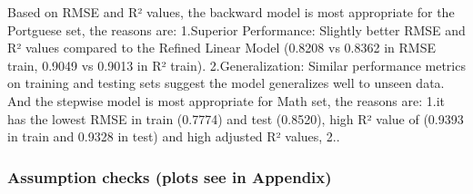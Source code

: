 \documentclass[letterpaper,9pt,twocolumn,twoside,]{pinp}
\begin{document}
\begin{table}[!h]
\centering
\caption{\label{tab:model selection}Model Performance Results for Portuguese and Math Datasets}
\centering
{}
\end{table}

Based on RMSE and R² values, the backward model is most appropriate for
the Portguese set, the reasons are: 1.Superior Performance: Slightly
better RMSE and R² values compared to the Refined Linear Model (0.8208
vs 0.8362 in RMSE train, 0.9049 vs 0.9013 in R² train).
2.Generalization: Similar performance metrics on training and testing
sets suggest the model generalizes well to unseen data. And the stepwise
model is most appropriate for Math set, the reasons are: 1.it has the
lowest RMSE in train (0.7774) and test (0.8520), high R² value of
(0.9393 in train and 0.9328 in test) and high adjusted R² values, 2..

\subsubsection{Assumption checks (plots see in
Appendix)}\label{assumption-checks-plots-see-in-appendix}
\end{document}
